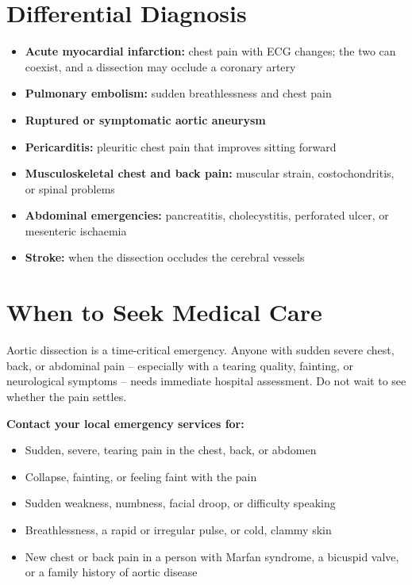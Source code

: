 \section*{Differential Diagnosis}
\begin{itemize}
    \item \textbf{Acute myocardial infarction:} chest pain with ECG changes; the two can coexist, and a dissection may occlude a coronary artery
    \item \textbf{Pulmonary embolism:} sudden breathlessness and chest pain
    \item \textbf{Ruptured or symptomatic aortic aneurysm}
    \item \textbf{Pericarditis:} pleuritic chest pain that improves sitting forward
    \item \textbf{Musculoskeletal chest and back pain:} muscular strain, costochondritis, or spinal problems
    \item \textbf{Abdominal emergencies:} pancreatitis, cholecystitis, perforated ulcer, or mesenteric ischaemia
    \item \textbf{Stroke:} when the dissection occludes the cerebral vessels
\end{itemize}

\section*{When to Seek Medical Care}
Aortic dissection is a time-critical emergency. Anyone with sudden severe chest, back, or abdominal pain -- especially with a tearing quality, fainting, or neurological symptoms -- needs immediate hospital assessment. Do not wait to see whether the pain settles.

\textbf{Contact your local emergency services for:}
\begin{itemize}
    \item Sudden, severe, tearing pain in the chest, back, or abdomen
    \item Collapse, fainting, or feeling faint with the pain
    \item Sudden weakness, numbness, facial droop, or difficulty speaking
    \item Breathlessness, a rapid or irregular pulse, or cold, clammy skin
    \item New chest or back pain in a person with Marfan syndrome, a bicuspid valve, or a family history of aortic disease
\end{itemize}

